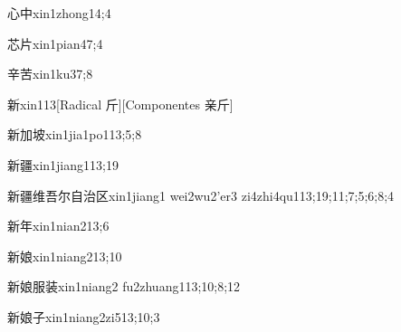 \begin{verbete}{心中}{xin1zhong1}{4;4}
\end{verbete}

\begin{verbete}{芯片}{xin1pian4}{7;4}
\end{verbete}

\begin{verbete}{辛苦}{xin1ku3}{7;8}
\end{verbete}

\begin{verbete}{新}{xin1}{13}[Radical 斤][Componentes 亲斤]
\end{verbete}

\begin{verbete}{新加坡}{xin1jia1po1}{13;5;8}
\end{verbete}

\begin{verbete}{新疆}{xin1jiang1}{13;19}
\end{verbete}

\begin{verbete}{新疆维吾尔自治区}{xin1jiang1 wei2wu2'er3 zi4zhi4qu1}{13;19;11;7;5;6;8;4}
\end{verbete}

\begin{verbete}{新年}{xin1nian2}{13;6}
\end{verbete}

\begin{verbete}{新娘}{xin1niang2}{13;10}
\end{verbete}

\begin{verbete}{新娘服装}{xin1niang2 fu2zhuang1}{13;10;8;12}
\end{verbete}

\begin{verbete}{新娘子}{xin1niang2zi5}{13;10;3}
\end{verbete}

